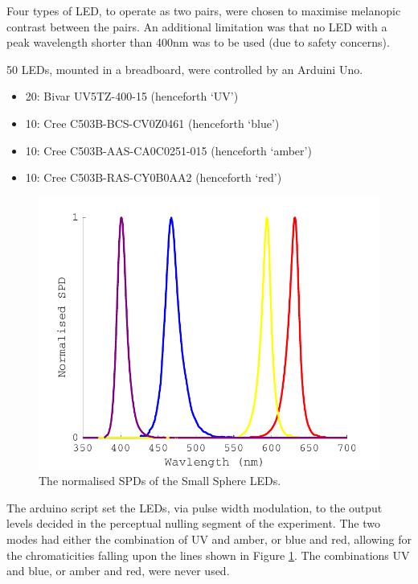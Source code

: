 Four types of LED, to operate as two pairs, were chosen to maximise melanopic contrast between the pairs. An additional limitation was that no LED with a peak wavelength shorter than 400nm was to be used (due to safety concerns).

50 LEDs, mounted in a breadboard, were controlled by an Arduini Uno. %

\begin{itemize}
    \item 20: Bivar UV5TZ-400-15 (henceforth `UV')
    \item 10: Cree C503B-BCS-CV0Z0461 (henceforth `blue')
    \item 10: Cree C503B-AAS-CA0C0251-015 (henceforth `amber')
    \item 10: Cree C503B-RAS-CY0B0AA2 (henceforth `red')
\end{itemize}


\begin{figure}[htbp]
\includegraphics[max width=\textwidth,center]{figs/SmallSphere/LED_SPDs.pdf}
\caption{The normalised \glspl{SPD} of the Small Sphere \glspl{LED}.}
\label{fig:LED_SPDs}
\end{figure}

The arduino script set the \glspl{LED}, via pulse width modulation, to the output levels decided in the perceptual nulling segment of the experiment. The two modes had either the combination of UV and amber, or blue and red, allowing for the chromaticities falling upon the lines shown in Figure \ref{fig:LED_SPDs}. The combinations UV and blue, or amber and red, were never used.

